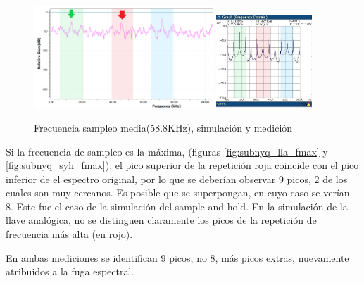 \documentclass[../../ASSD_TP1_G7.tex]{subfiles}
\begin{document}
\begin{figure}[H]
\centering
{}
{\includegraphics[width=0.6\textwidth]{figures/simpto_8_syh_58,8_espectro.png}}
{\includegraphics[width=0.32\textwidth]{figures/syh_fmed.jpeg}}
\caption{Frecuencia sampleo media(58.8KHz), simulación y medición}
\label{fig:subnyq_syh_fmed}
\end{figure}


Si la frecuencia de sampleo es la m\'axima, (figuras \ref{fig:subnyq_lla_fmax} y \ref{fig:subnyq_syh_fmax}), el pico superior de la repetici\'on roja coincide con el pico inferior de el espectro original, por lo que se deber\'ian observar 9 picos, 2 de los cuales son muy cercanos. 
Es posible que se superpongan, en cuyo caso se ver\'ian 8. 
Este fue el caso de la simulaci\'on del sample and hold. 
En la simulaci\'on de la llave anal\'ogica, no se distinguen claramente los picos de la repetici\'on de frecuencia m\'as alta (en rojo).

En ambas mediciones se identifican 9 picos, no 8, m\'as picos extras, nuevamente atribuidos a la fuga espectral.
\end{document}
